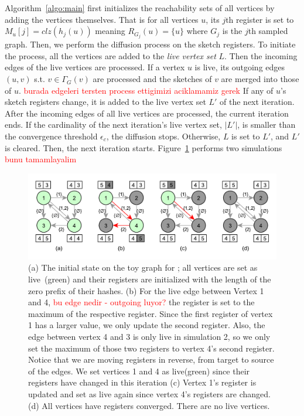 \documentclass[10pt,journal,compsoc]{IEEEtran}
\newcommand\acro{{\sc{HyperFuseR\xspace}\xspace}\xspace}
\newcommand\kktodo[1]{\textcolor{red}{#1}}
\begin{document}
 Algorithm~\ref{algo:main} first initializes the reachability sets of all vertices by adding the vertices themselves. That is for all vertices $u$, its $j$th register is set to $M_u[j]=clz(h_j(u))$ meaning $R_{{G}_j}(u) = \{u\}$ where $G_j$ is the $j$th sampled graph. Then, we perform the diffusion process on the sketch registers. To initiate the process, all the vertices are added to the {\em live vertex set} $L$. Then the incoming edges of the live vertices are processed. If a vertex $u$ is live, its outgoing edges $(u, v)$ s.t. $v \in \Gamma_G(v)$ are processed and the sketches of $v$ are merged into those of $u$. \kktodo{burada edgeleri tersten process ettigimizi aciklamamiz gerek} If any of $u$'s sketch registers change, it is added to the live vertex set $L'$ of the next iteration. After the incoming edges of all live vertices are processed, the current iteration ends. If the cardinality of the next iteration's live vertex set, $|L'|$, is smaller than the convergence threshold $\epsilon_c$, the diffusion stops. Otherwise, $L$ is set to $L'$, and $L'$ is cleared. Then, the next iteration starts. Figure~\ref{fig:hf-processing} performs two simulations\kktodo{ bunu tamamlayalim}
 
\begin{figure}[!ht]
    \begin{center}
    \includegraphics[width=0.7\linewidth]{images/sketch-diffusion.pdf}
    \caption{(a) The initial state on the toy graph for \acro{}; all vertices are set as live~(green) and their registers are initialized with the length of the zero prefix of their hashes. (b) 
    For the live edge between Vertex 1 and 4, \kktodo{bu edge nedir - outgoing luyor?} the register is set to the maximum of the respective register. Since the first register of vertex 1 has a larger value, we only update the second register. Also, the edge between vertex 4 and 3 is only live in simulation 2, so we only set the maximum of those two registers to vertex 4's second register. Notice that we are moving registers in reverse, from target to source of the edges. We set vertices 1 and 4 as live(green) since their registers have changed in this iteration (c) Vertex 1's register is updated and set as live again since vertex 4's registers are changed.  (d) All vertices have registers converged. There are no live vertices. }\label{fig:hf-processing} 
    \end{center}
    \end{figure} 
 
\end{document}
